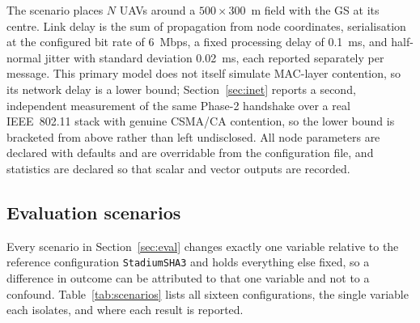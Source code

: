 \documentclass[journal]{IEEEtran}
\begin{document}
The scenario places $N$ UAVs around a $500\times300$~m field with the GS at its
centre. Link delay is the sum of propagation from node coordinates,
serialisation at the configured bit rate of 6~Mbps, a fixed processing delay of
0.1~ms, and half-normal jitter with standard deviation 0.02~ms, each reported
separately per message. This primary model does not itself simulate MAC-layer
contention, so its network delay is a lower bound; Section~\ref{sec:inet}
reports a second, independent measurement of the same Phase-2 handshake over a
real IEEE~802.11 stack with genuine CSMA/CA contention, so the lower bound is
bracketed from above rather than left undisclosed. All node parameters are
declared with defaults and are overridable from the configuration file, and
statistics are declared so that scalar and vector outputs are recorded.

\subsection{Evaluation scenarios}

Every scenario in Section~\ref{sec:eval} changes exactly one variable relative
to the reference configuration \texttt{StadiumSHA3} and holds everything else
fixed, so a difference in outcome can be attributed to that one variable and not
to a confound. Table~\ref{tab:scenarios} lists all sixteen configurations,
the single variable each isolates, and where each result is reported.
\end{document}
